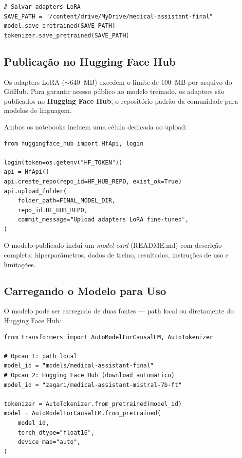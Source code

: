 \begin{lstlisting}[caption={Salvando o modelo fine-tuned}, label={lst:save-model}]
# Salvar adapters LoRA
SAVE_PATH = "/content/drive/MyDrive/medical-assistant-final"
model.save_pretrained(SAVE_PATH)
tokenizer.save_pretrained(SAVE_PATH)
\end{lstlisting}

\subsection{Publicação no Hugging Face Hub}
\label{subsec:hf-hub}

Os adapters LoRA ($\sim$640~MB) excedem o limite de 100~MB por arquivo do GitHub. Para garantir acesso público ao modelo treinado, os adapters são publicados no \textbf{Hugging Face Hub}, o repositório padrão da comunidade para modelos de linguagem.

Ambos os notebooks incluem uma célula dedicada ao upload:

\begin{lstlisting}[caption={Upload do modelo para o Hugging Face Hub}, label={lst:hf-upload}]
from huggingface_hub import HfApi, login

login(token=os.getenv("HF_TOKEN"))
api = HfApi()
api.create_repo(repo_id=HF_HUB_REPO, exist_ok=True)
api.upload_folder(
    folder_path=FINAL_MODEL_DIR,
    repo_id=HF_HUB_REPO,
    commit_message="Upload adapters LoRA fine-tuned",
)
\end{lstlisting}

O modelo publicado inclui um \textit{model card} (README.md) com descrição completa: hiperparâmetros, dados de treino, resultados, instruções de uso e limitações.

\subsection{Carregando o Modelo para Uso}

O modelo pode ser carregado de duas fontes --- path local ou diretamente do Hugging Face Hub:

\begin{lstlisting}[caption={Carregando o modelo fine-tuned para inferência}, label={lst:load-model}]
from transformers import AutoModelForCausalLM, AutoTokenizer

# Opcao 1: path local
model_id = "models/medical-assistant-final"
# Opcao 2: Hugging Face Hub (download automatico)
model_id = "zagari/medical-assistant-mistral-7b-ft"

tokenizer = AutoTokenizer.from_pretrained(model_id)
model = AutoModelForCausalLM.from_pretrained(
    model_id,
    torch_dtype="float16",
    device_map="auto",
)
\end{lstlisting}


